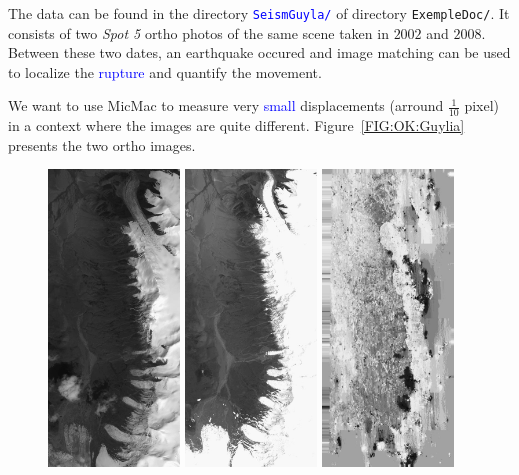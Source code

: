 The data can be found in the directory {\tt \textcolor{blue}{SeismGuyla/}} %
 of directory {\tt ExempleDoc/}. %
It consists of  two \emph{Spot 5} ortho photos of the same scene taken in $2002$ and
$2008$. Between these two dates, an earthquake occured and image matching can be used to
localize the \textcolor{blue}{rupture} and quantify the movement.

We want to use MicMac to measure very \textcolor{blue}{small} displacements (arround $\frac{1}{10}$ pixel) in
a context where the images are quite different. Figure~\ref{FIG:OK:Guylia} presents the two
ortho images.

\begin{figure}
\begin{center}
\includegraphics[width=35mm]{FIGS/SeismGuylia/250802_ortho.jpg}
\includegraphics[width=35mm]{FIGS/SeismGuylia/260608_ortho.jpg}
\includegraphics[width=35mm]{FIGS/SeismGuylia/Px1.jpg}

\end{center}
\end{figure}
